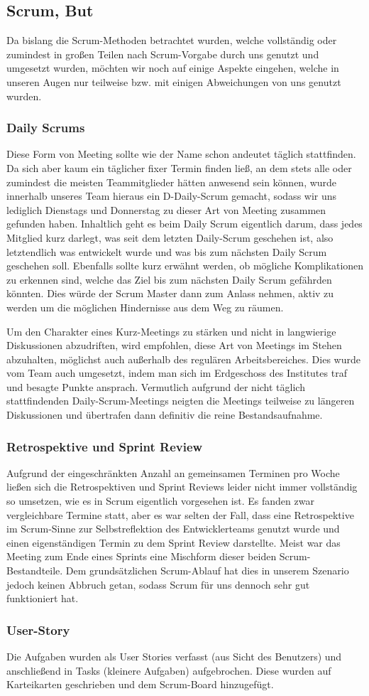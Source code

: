 \subsection{Scrum, But}
Da bislang die Scrum-Methoden betrachtet wurden, welche vollständig oder zumindest in großen Teilen nach Scrum-Vorgabe durch uns genutzt und umgesetzt wurden, möchten wir noch auf einige Aspekte eingehen, welche in unseren Augen nur teilweise bzw. mit einigen Abweichungen von uns genutzt wurden.
\subsubsection{Daily Scrums}
Diese Form von Meeting sollte wie der Name schon andeutet täglich stattfinden. Da sich aber kaum ein täglicher fixer Termin finden ließ, an dem stets alle oder zumindest die meisten Teammitglieder hätten anwesend sein können, wurde innerhalb unseres Team hieraus ein D-Daily-Scrum gemacht, %
 sodass wir uns lediglich Dienstags und Donnerstag zu dieser Art von Meeting zusammen gefunden haben.
Inhaltlich geht es beim Daily Scrum eigentlich darum, dass jedes Mitglied kurz darlegt, was seit dem letzten Daily-Scrum geschehen ist, also letztendlich was entwickelt wurde und was bis zum nächsten Daily Scrum geschehen soll. Ebenfalls sollte kurz erwähnt werden, ob mögliche Komplikationen zu erkennen sind, welche das Ziel bis zum nächsten Daily Scrum gefährden könnten. Dies würde der Scrum Master dann zum Anlass nehmen, aktiv zu werden um die möglichen Hindernisse aus dem Weg zu räumen.

Um den Charakter eines Kurz-Meetings zu stärken und nicht in langwierige Diskussionen abzudriften, wird empfohlen, diese Art von Meetings im Stehen abzuhalten, möglichst auch außerhalb des regulären Arbeitsbereiches. Dies wurde vom Team auch umgesetzt, indem man sich im Erdgeschoss des Institutes traf und besagte Punkte ansprach. Vermutlich aufgrund der nicht täglich stattfindenden Daily-Scrum-Meetings neigten die Meetings teilweise zu längeren Diskussionen und übertrafen dann definitiv die reine Bestandsaufnahme.

\subsubsection{Retrospektive und Sprint Review}
Aufgrund der eingeschränkten Anzahl an gemeinsamen Terminen pro Woche ließen sich die Retrospektiven und Sprint Reviews leider nicht immer vollständig so umsetzen, wie es in Scrum eigentlich vorgesehen ist. Es fanden zwar vergleichbare Termine statt, aber es war selten der Fall, dass eine Retrospektive im Scrum-Sinne zur Selbstreflektion des Entwicklerteams genutzt wurde und einen eigenständigen Termin zu dem Sprint Review darstellte. Meist war das Meeting zum Ende eines Sprints eine Mischform dieser beiden Scrum-Bestandteile.
Dem grundsätzlichen Scrum-Ablauf hat dies in unserem Szenario jedoch keinen Abbruch getan, sodass Scrum für uns dennoch sehr gut funktioniert hat.

\subsubsection{User-Story}
Die Aufgaben wurden als User Stories verfasst (aus Sicht des Benutzers) und 
anschließend in Tasks (kleinere Aufgaben) aufgebrochen. 
Diese wurden auf Karteikarten geschrieben und dem Scrum-Board hinzugefügt. 
